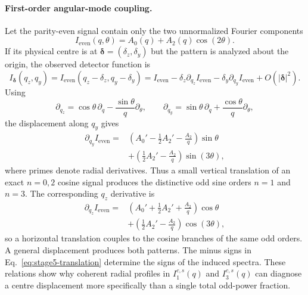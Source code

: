 \documentclass[aps,prb,preprint,onecolumn,notitlepage,amsmath,amssymb,
  superscriptaddress,floatfix]{revtex4-2}
\begin{document}
\paragraph{First-order angular-mode coupling.}
Let the parity-even signal contain only the two unnormalized Fourier
components
\begin{equation}
 I_{\mathrm{even}}(q,\theta)=A_0(q)+A_2(q)\cos(2\theta).
 \label{eq:stage5-even-signal}
\end{equation}
If its physical centre is at
$\bm\delta=(\delta_z,\delta_y)$ but the pattern is analyzed about the origin,
the observed detector function is
\begin{equation}
 I_{\bm\delta}(q_z,q_y)
 =I_{\mathrm{even}}(q_z-\delta_z,q_y-\delta_y)
 =I_{\mathrm{even}}-\delta_z\partial_{q_z}I_{\mathrm{even}}
  -\delta_y\partial_{q_y}I_{\mathrm{even}}+O(|\bm\delta|^2).
 \label{eq:stage5-translation}
\end{equation}
Using
\begin{equation}
 \partial_{q_z}=\cos\theta\,\partial_q
 -\frac{\sin\theta}{q}\partial_\theta,
 \qquad
 \partial_{q_y}=\sin\theta\,\partial_q
 +\frac{\cos\theta}{q}\partial_\theta,
 \label{eq:stage5-polar-derivatives}
\end{equation}
the displacement along $q_y$ gives
\begin{align}
 \partial_{q_y}I_{\mathrm{even}}
 ={}&\left(A_0'-\frac12A_2'-\frac{A_2}{q}\right)\sin\theta
 \nonumber\\
 &+\left(\frac12A_2'-\frac{A_2}{q}\right)\sin(3\theta),
 \label{eq:stage5-qy-coupling}
\end{align}
where primes denote radial derivatives.  Thus a small vertical translation
of an exact $n=0,2$ cosine signal produces the distinctive odd sine orders
$n=1$ and $n=3$.  The corresponding $q_z$ derivative is
\begin{align}
 \partial_{q_z}I_{\mathrm{even}}
 ={}&\left(A_0'+\frac12A_2'+\frac{A_2}{q}\right)\cos\theta
 \nonumber\\
 &+\left(\frac12A_2'-\frac{A_2}{q}\right)\cos(3\theta),
 \label{eq:stage5-qz-coupling}
\end{align}
so a horizontal translation couples to the cosine branches of the same odd
orders.  A general displacement produces both patterns.  The minus signs in
Eq.~\eqref{eq:stage5-translation} determine the signs of the induced spectra.
These relations show why coherent radial profiles in $I_1^{c,s}(q)$ and
$I_3^{c,s}(q)$ can diagnose a centre displacement more specifically than a
single total odd-power fraction.
\end{document}
